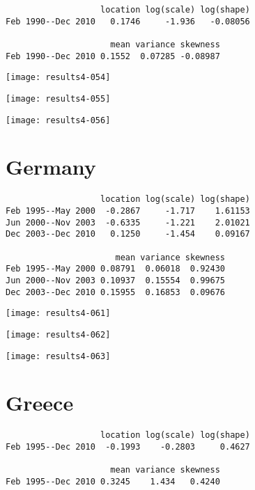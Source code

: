 \documentclass[a4paper]{article}
\begin{document}
\begin{verbatim}
                   location log(scale) log(shape)
Feb 1990--Dec 2010   0.1746     -1.936   -0.08056

                     mean variance skewness
Feb 1990--Dec 2010 0.1552  0.07285 -0.08987

\end{verbatim}

\begin{center}
\texttt{[image: results4-054]}

\texttt{[image: results4-055]}

\texttt{[image: results4-056]}
\end{center}


\newpage

\section*{Germany}


\begin{verbatim}
                   location log(scale) log(shape)
Feb 1995--May 2000  -0.2867     -1.717    1.61153
Jun 2000--Nov 2003  -0.6335     -1.221    2.01021
Dec 2003--Dec 2010   0.1250     -1.454    0.09167

                      mean variance skewness
Feb 1995--May 2000 0.08791  0.06018  0.92430
Jun 2000--Nov 2003 0.10937  0.15554  0.99675
Dec 2003--Dec 2010 0.15955  0.16853  0.09676

\end{verbatim}

\begin{center}
\texttt{[image: results4-061]}

\texttt{[image: results4-062]}

\texttt{[image: results4-063]}
\end{center}


\newpage

\section*{Greece}


\begin{verbatim}
                   location log(scale) log(shape)
Feb 1995--Dec 2010  -0.1993    -0.2803     0.4627

                     mean variance skewness
Feb 1995--Dec 2010 0.3245    1.434   0.4240

\end{verbatim}
\end{document}
